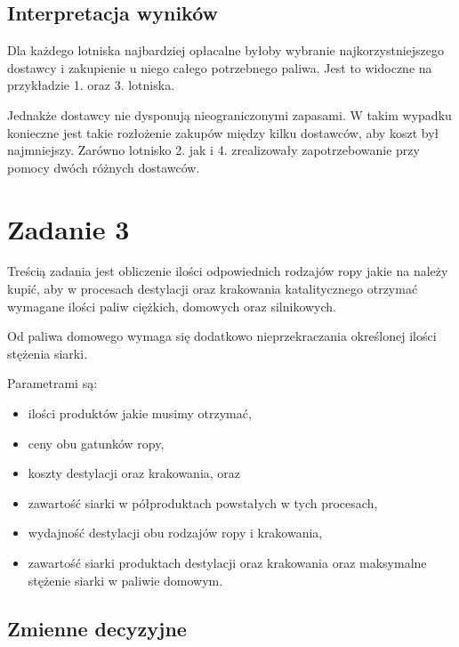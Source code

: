 \documentclass[polish,12pt,titlepage]{article}
\begin{document}
\subsection{Interpretacja wyników}

Dla każdego lotniska najbardziej opłacalne byłoby wybranie najkorzystniejszego dostawcy i zakupienie u niego całego potrzebnego paliwa. Jest to widoczne na przykładzie 1. oraz 3. lotniska.

Jednakże dostawcy nie dysponują nieograniczonymi zapasami. W takim wypadku konieczne jest takie rozłożenie zakupów między kilku dostawców, aby koszt był najmniejszy. Zarówno lotnisko 2. jak i 4. zrealizowały zapotrzebowanie przy pomocy dwóch różnych dostawców.

\section{Zadanie 3}

Treścią zadania jest obliczenie ilości odpowiednich rodzajów ropy jakie na należy kupić, aby w procesach destylacji oraz krakowania katalitycznego otrzymać wymagane ilości paliw ciężkich, domowych oraz silnikowych.

Od paliwa domowego wymaga się dodatkowo nieprzekraczania określonej ilości stężenia siarki.

Parametrami są:
\begin{itemize}
    \item ilości produktów jakie musimy otrzymać,
    \item ceny obu gatunków ropy,
    \item koszty destylacji oraz krakowania, oraz
    \item zawartość siarki w półproduktach powstałych w tych procesach,
    \item wydajność destylacji obu rodzajów ropy i krakowania,
    \item zawartość siarki produktach destylacji oraz krakowania oraz maksymalne stężenie siarki w paliwie domowym.
\end{itemize}

\subsection{Zmienne decyzyjne}
\end{document}
